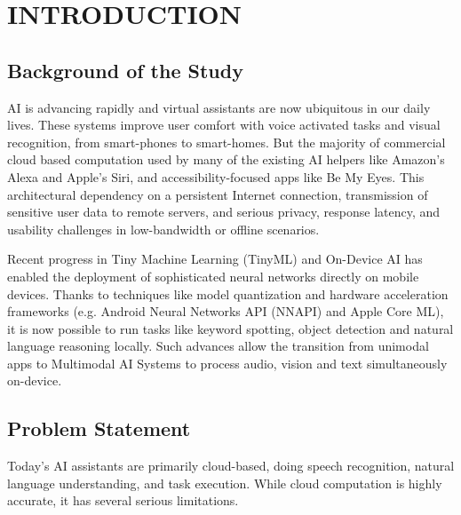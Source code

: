 \documentclass[12pt,a4paper]{report}
\begin{document}
\restoregeometry
\clearpage
\pagestyle{plain}
\setcounter{page}{1}
 
\chapter{INTRODUCTION}
 
\section{Background of the Study}
\noindent AI is advancing rapidly and virtual assistants are now ubiquitous in our daily lives. These systems improve user comfort with voice activated tasks and visual recognition, from smart-phones to smart-homes. But the majority of commercial cloud based computation used by many of the existing AI helpers like Amazon’s Alexa and Apple’s Siri, and accessibility-focused apps like Be My Eyes. This architectural dependency on a persistent Internet connection, transmission of sensitive user data to remote servers, and serious privacy, response latency, and usability challenges in low-bandwidth or offline scenarios.
 
\noindent Recent progress in Tiny Machine Learning (TinyML) and On-Device AI has enabled the deployment of sophisticated neural networks directly on mobile devices. Thanks to techniques like model quantization and hardware acceleration frameworks (e.g. Android Neural Networks API (NNAPI) and Apple Core ML), it is now possible to run tasks like keyword spotting, object detection and natural language reasoning locally. Such advances allow the transition from unimodal apps to Multimodal AI Systems to process audio, vision and text simultaneously on-device.

\section{Problem Statement}
Today’s AI assistants are primarily cloud-based, doing speech recognition, natural language understanding, and task execution. While cloud computation is highly accurate, it has several serious limitations.
\end{document}
